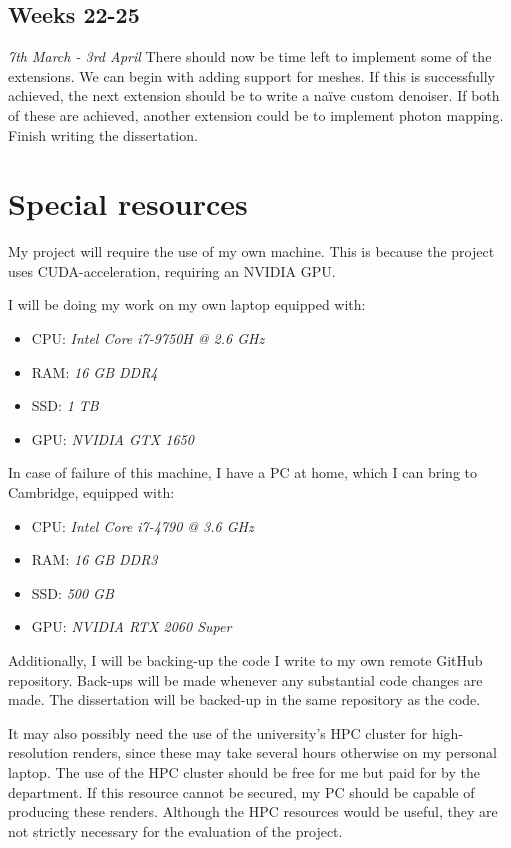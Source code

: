 \documentclass[12pt, a4paper]{article}
\newcommand{\newtime}[3]{
    \subsection*{#1}
    \vspace{-\baselineskip}
    \emph{#2}
    \vspace{\baselineskip}
    \newline
    #3
}
\begin{document}
    \newtime{Weeks 22-25}{7th March - 3rd April}{There should now be time left to implement some of the extensions. We can begin with adding support for meshes. If this is successfully achieved, the next extension should be to write a naïve custom denoiser. If both of these are achieved, another extension could be to implement photon mapping. Finish writing the dissertation.}

    \section*{Special resources}
    My project will require the use of my own machine. This is because the project uses CUDA-acceleration, requiring an NVIDIA GPU.

    I will be doing my work on my own laptop equipped with:
    \begin{itemize}
        \setlength\itemsep{0.1em}
        \item CPU: \emph{Intel Core i7-9750H @ 2.6 GHz}
        \item RAM: \emph{16 GB DDR4}
        \item SSD: \emph{1 TB}
        \item GPU: \emph{NVIDIA GTX 1650}
    \end{itemize}
    
    In case of failure of this machine, I have a PC at home, which I can bring to Cambridge, equipped with:
    \begin{itemize}
        \setlength\itemsep{0.1em}
        \item CPU: \emph{Intel Core i7-4790 @ 3.6 GHz}
        \item RAM: \emph{16 GB DDR3}
        \item SSD: \emph{500 GB}
        \item GPU: \emph{NVIDIA RTX 2060 Super}
    \end{itemize}

    Additionally, I will be backing-up the code I write to my own remote GitHub repository. Back-ups will be made whenever any substantial code changes are made. The dissertation will be backed-up in the same repository as the code.

    It may also possibly need the use of the university’s HPC cluster for high-resolution renders, since these may take several hours otherwise on my personal laptop. The use of the HPC cluster should be free for me but paid for by the department. If this resource cannot be secured, my PC should be capable of producing these renders. Although the HPC resources would be useful, they are not strictly necessary for the evaluation of the project.
\end{document}
